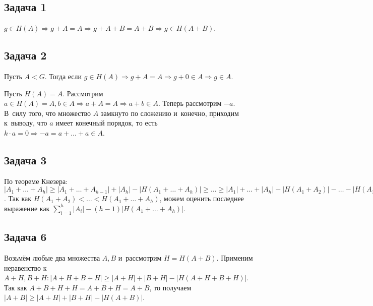 \documentclass{article}
\begin{document}
\subsection*{Задача 1}
	$g \in H(A) \Rightarrow g + A = A \Rightarrow g + A + B = A + B \Rightarrow g
	\in H(A + B)$.

\subsection*{Задача 2}
	Пусть $A < G$. Тогда если $g \in H(A) \Rightarrow g + A = A \Rightarrow g + 0
	\in A \Rightarrow g \in A$.

	Пусть $H(A) = A$. Рассмотрим $a \in H(A) = A, b \in A \Rightarrow a + A = A
	\Rightarrow a +	b \in A$. Теперь рассмотрим $-a$. В~силу того, что множество
	$A$ замкнуто по сложению и~конечно, приходим к~выводу, что $a$ имеет конечный
	порядок, то есть $k \cdot a = 0 \Rightarrow -a = a + \ldots + a \in A$.

\subsection*{Задача 3}
	По теореме Кнезера:
	$|A_1 + \ldots + A_h| \ge |A_1 + \ldots + A_{h-1}| + |A_h| - |H(A_1 + \ldots
	+ A_h)| \ge \ldots \ge |A_1| + \ldots + |A_h| - |H(A_1 + A_2)| - \ldots
	- |H(A_1 + \ldots + A_h)|$. Так как $H(A_1 + A_2) < \ldots < H(A_1 + \ldots +
	A_h)$, можем оценить последнее выражение как $\sum\limits_{i=1}^h |A_i| -
	(h-1) |H(A_1 + \ldots + A_h)|$.

\subsection*{Задача 6}
	Возьмём любые два множества $A, B$ и~рассмотрим $H = H(A + B)$. Применим
	неравенство к~$A + H, B + H: |A + H + B + H| \ge |A + H| + |B + H| - |H(A + H
	+ B + H)|$. Так как $A + B + H + H = A + B + H = A + B$, то получаем $|A + B|
	\ge |A + H| + |B + H| - |H(A + B)|$.
\end{document}
